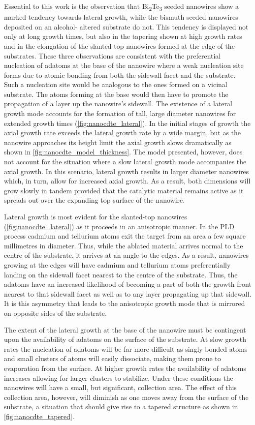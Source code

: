 Essential to this work is the observation that Bi\textsubscript{2}Te\textsubscript{3} seeded
nanowires show a marked tendency towards lateral growth,
while the bismuth seeded nanowires deposited on an alcohol-
altered substrate do not. This tendency is displayed not only
at long growth times, but also in the tapering shown at high
growth rates and in the elongation of the slanted-top nanowires
formed at the edge of the substrates. These three observations
are consistent with the preferential nucleation of adatoms at the
base of the nanowire where a weak nucleation site forms due to
atomic bonding from both the sidewall facet and the substrate.
Such a nucleation site would be analogous to the ones formed
on a vicinal substrate\cite{Ratsch2005a}. The atoms forming at the base
would then have to promote the propagation of a layer up the
nanowire's sidewall. The existence of a lateral growth mode
accounts for the formation of tall, large diameter nanowires
for extended growth times (\cref{fig:nanocdte_lateral}). In the initial stages of
growth the axial growth rate exceeds the lateral growth rate by
a wide margin, but as the nanowire approaches its height limit
the axial growth slows dramatically as shown in \cref{fig:nanocdte_model_thickness}.
The model presented, however, does not account for the
situation where a slow lateral growth mode accompanies the
axial growth. In this scenario, lateral growth results in larger
diameter nanowires which, in turn, allow for increased axial growth. As a result, both dimensions will grow slowly in
tandem provided that the catalytic material remains active as
it spreads out over the expanding top surface of the nanowire.

Lateral growth is most evident for the slanted-top
nanowires (\cref{fig:nanocdte_lateral}) as it proceeds in an anisotropic manner.
In the PLD process cadmium and tellurium atoms exit the
target from an area a few square millimetres in diameter.
Thus, while the ablated material arrives normal to the centre
of the substrate, it arrives at an angle to the edges. As a
result, nanowires growing at the edges will have cadmium and
tellurium atoms preferentially landing on the sidewall facet
nearest to the centre of the substrate. Thus, the adatoms have
an increased likelihood of becoming a part of both the growth
front nearest to that sidewall facet as well as to any layer
propagating up that sidewall. It is this asymmetry that leads
to the anisotropic growth mode that is mirrored on opposite
sides of the substrate.

The extent of the lateral growth at the base of the nanowire
must be contingent upon the availability of adatoms on the
surface of the substrate. At slow growth rates the nucleation
of adatoms will be far more difficult as singly bonded atoms
and small clusters of atoms will easily dissociate, making
them prone to evaporation from the surface. At higher growth
rates the availability of adatoms increases allowing for larger
clusters to stabilize. Under these conditions the nanowires will
have a small, but significant, collection area. The effect of
this collection area, however, will diminish as one moves away
from the surface of the substrate, a situation that should give
rise to a tapered structure as shown in \cref{fig:nanocdte_tapered}.

